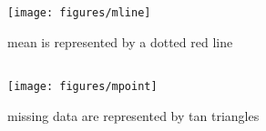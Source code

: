 \documentclass[
]{book}
\begin{document}
\begin{columns-nocenter}

\begin{column}

\begin{figure}
\texttt{[image: figures/mline]} \caption{mean is represented by a dotted red line}\label{fig:unnamed-chunk-83}
\end{figure}

\end{column}

\begin{column}

\begin{figure}
\texttt{[image: figures/mpoint]} \caption{missing data are represented by tan triangles}\label{fig:unnamed-chunk-84}
\end{figure}

\end{column}

\begin{column}

\end{column}

\end{columns-nocenter}
\end{document}
